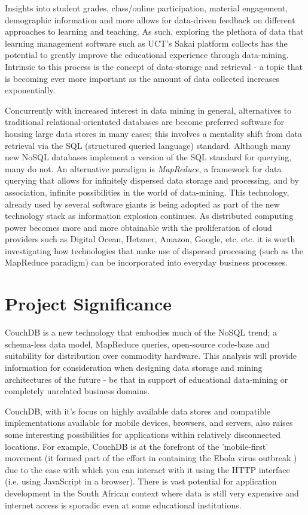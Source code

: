 Insights into student grades, class/online participation, material engagement, demographic information and more allows for data-driven feedback on different approaches to learning and teaching. As such, exploring the plethora of data that learning management software such as UCT's Sakai platform collects has the potential to greatly improve the educational experience through data-mining. Intrinsic to this process is the concept of data-storage and retrieval - a topic that is becoming ever more important as the amount of data collected increases exponentially.

Concurrently with increased interest in data mining in general, alternatives to traditional relational-orientated databases are become preferred software for housing large data stores in many cases; this involves a mentality shift from data retrieval via the SQL (structured queried language) standard. Although many new NoSQL databases implement a version of the SQL standard for querying, many do not. An alternative paradigm is \textit{MapReduce}, a framework for data querying that allows for infinitely dispersed data storage and processing, and by association, infinite possibilities in the world of data-mining. This technology, already used by several software giants \cite{chandar2010} is being adopted as part of the new technology stack as information explosion continues. As distributed computing power becomes more and more obtainable with the proliferation of cloud providers such as Digital Ocean, Hetzner, Amazon, Google, etc. etc. it is worth investigating how technologies that make use of dispersed processing (such as the MapReduce paradigm) can be incorporated into everyday business processes.

\section{Project Significance}
CouchDB is a new technology that embodies much of the NoSQL trend; a schema-less data model, MapReduce queries, open-source code-base and suitability for distribution over commodity hardware. This analysis will provide information for consideration when designing data storage and mining architectures of the future - be that in support of educational data-mining or completely unrelated business domains.

CouchDB, with it's focus on highly available data stores and compatible implementations available for mobile devices, browsers, and servers, also raises some interesting possibilities for applications within relatively disconnected locations. For example, CouchDB is at the forefront of the 'mobile-first' movement (it formed part of the effort in containing the Ebola virus outbreak \cite{ebola2017}) due to the ease with which you can interact with it using the HTTP interface (i.e. using JavaScript in a browser). There is vast potential for application development in the South African context where data is still very expensive and internet access is sporadic even at some educational institutions.

